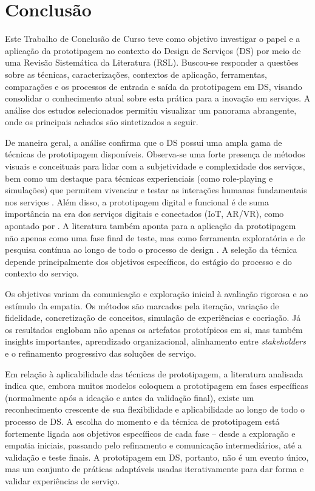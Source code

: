 \chapter[Conclusão]{Conclusão}

Este Trabalho de Conclusão de Curso teve como objetivo investigar o papel e a aplicação da prototipagem no contexto do Design de Serviços (DS) por meio de uma Revisão Sistemática da Literatura (RSL). Buscou-se responder a questões sobre as técnicas, caracterizações, contextos de aplicação, ferramentas, comparações e os processos de entrada e saída da prototipagem em DS, visando consolidar o conhecimento atual sobre esta prática para a inovação em serviços. A análise dos estudos selecionados permitiu visualizar um panorama abrangente, onde os principais achados são sintetizados a seguir.

De maneira geral, a análise confirma que o DS possui uma ampla gama de técnicas de prototipagem disponíveis. Observa-se uma forte presença de métodos visuais e conceituais para lidar com a subjetividade e complexidade dos serviços, bem como um destaque para técnicas experienciais (como role-playing e simulações) que permitem vivenciar e testar as interações humanas fundamentais nos serviços \cite{soto2023prototyping, seko2024transitions}. Além disso, a prototipagem digital e funcional é de suma importância na era dos serviços digitais e conectados (IoT, AR/VR), como apontado por . A literatura também aponta para a aplicação da prototipagem não apenas como uma fase final de teste, mas como ferramenta exploratória e de pesquisa contínua ao longo de todo o processo de design \cite{soto2023prototyping, paust2025integrative}. A seleção da técnica depende principalmente dos objetivos específicos, do estágio do processo e do contexto do serviço.

Os objetivos variam da comunicação e exploração inicial à avaliação rigorosa e ao estímulo da empatia. Os métodos são marcados pela iteração, variação de fidelidade, concretização de conceitos, simulação de experiências e cocriação. Já os resultados englobam não apenas os artefatos prototípicos em si, mas também insights importantes, aprendizado organizacional, alinhamento entre \textit{stakeholders} e o refinamento progressivo das soluções de serviço.

Em relação à aplicabilidade das técnicas de prototipagem, a literatura analisada indica que, embora muitos modelos coloquem a prototipagem em fases específicas (normalmente após a ideação e antes da validação final), existe um reconhecimento crescente de sua flexibilidade e aplicabilidade ao longo de todo o processo de DS. A escolha do momento e da técnica de prototipagem está fortemente ligada aos objetivos específicos de cada fase – desde a exploração e empatia iniciais, passando pelo refinamento e comunicação intermediários, até a validação e teste finais. A prototipagem em DS, portanto, não é um evento único, mas um conjunto de práticas adaptáveis usadas iterativamente para dar forma e validar experiências de serviço.

